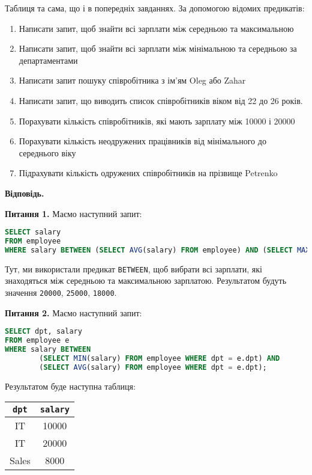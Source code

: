 \documentclass{hw_template}
\begin{document}
\begin{problem}
    Таблиця та сама, що і в попередніх завданнях. За допомогою відомих предикатів:
    \begin{enumerate}
        \item Написати запит, щоб знайти всі зарплати між середньою та максимальною
        \item Написати запит, щоб знайти всі зарплати між мінімальною та середньою за
        департаментами
        \item Написати запит пошуку співробітника з ім'ям Oleg або Zahar
        \item Написати запит, що виводить список співробітників віком від 22 до 26 років.
        \item Порахувати кількість співробітників, які мають зарплату між 10000 і 20000
        \item Порахувати кількість неодружених працівників від мінімального до середнього
        віку
        \item Підрахувати кількість одружених співробітників на прізвище Petrenko
    \end{enumerate}
\end{problem}

\textbf{Відповідь.}

\textbf{Питання 1.} Маємо наступний запит:
\begin{lstlisting}[language=SQL]
SELECT salary
FROM employee
WHERE salary BETWEEN (SELECT AVG(salary) FROM employee) AND (SELECT MAX(salary) FROM employee);    
\end{lstlisting}

Тут, ми використали предикат \texttt{BETWEEN}, щоб вибрати всі зарплати, які
знаходяться між середньою та максимальною зарплатою. Результатом будуть значення 
\texttt{20000}, \texttt{25000}, \texttt{18000}. 

\textbf{Питання 2.} Маємо наступний запит:
\begin{lstlisting}[language=SQL]
SELECT dpt, salary
FROM employee e
WHERE salary BETWEEN 
        (SELECT MIN(salary) FROM employee WHERE dpt = e.dpt) AND
        (SELECT AVG(salary) FROM employee WHERE dpt = e.dpt);
\end{lstlisting}

Результатом буде наступна таблиця:

\begin{table}[H]
    \centering
    \begin{tabular}{|c|c|}
        \hline
        \texttt{dpt} & \texttt{salary} \\
        \hline
        IT & 10000 \\
        IT & 20000 \\
        Sales & 8000 \\
        \hline
    \end{tabular}
\end{table}
\end{document}
